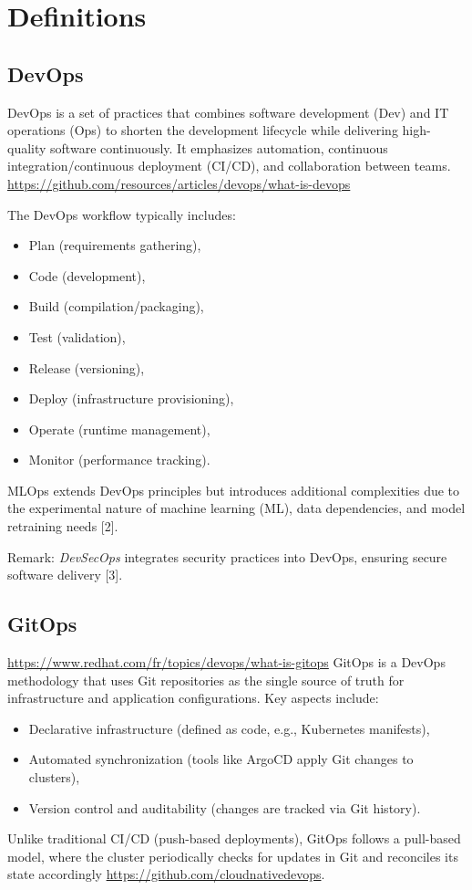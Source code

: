 \section{Definitions}
\subsection{DevOps}
DevOps is a set of practices that combines software development (Dev) and IT
operations (Ops) to shorten the development lifecycle while delivering
high-quality software continuously.
It emphasizes automation, continuous integration/continuous deployment (CI/CD), and collaboration between
teams. \url{https://github.com/resources/articles/devops/what-is-devops}

The DevOps workflow typically includes:

\begin{itemize}
    \item Plan (requirements gathering),
    \item Code (development),
    \item Build (compilation/packaging),
    \item Test (validation),
    \item Release (versioning),
    \item Deploy (infrastructure provisioning),
    \item Operate (runtime management),
    \item Monitor (performance tracking).
\end{itemize}
MLOps
 extends DevOps principles but introduces additional complexities due to
 the experimental nature of machine learning (ML), data dependencies,
and model retraining needs [2].

Remark: \textit{DevSecOps} integrates security practices into DevOps, ensuring secure software delivery [3].

\subsection{GitOps}
\url{https://www.redhat.com/fr/topics/devops/what-is-gitops}
GitOps is a DevOps methodology that uses Git repositories as the single source of truth for infrastructure and application configurations. Key aspects include:

\begin{itemize}
\item Declarative infrastructure (defined as code, e.g., Kubernetes manifests),
\item Automated synchronization (tools like ArgoCD apply Git changes to clusters),
\item Version control and auditability (changes are tracked via Git history).
\end{itemize}
Unlike traditional CI/CD (push-based deployments), GitOps follows a pull-based model, where the cluster periodically checks for updates in Git and reconciles its state accordingly\cite{devopsbook} \url{https://github.com/cloudnativedevops}.

